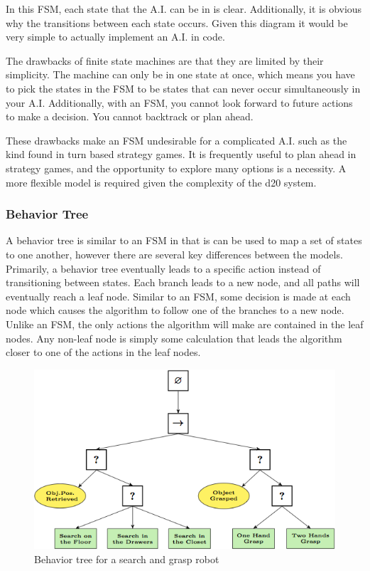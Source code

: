 \documentclass[12pt,a4paper]{report}
\begin{document}
		In this FSM, each state that the A.I. can be in is clear. Additionally, it is obvious why the transitions between each state occurs. Given this diagram it would be very simple to actually implement an A.I. in code. 
		
		The drawbacks of finite state machines are that they are limited by their simplicity. The machine can only be in one state at once, which means you have to pick the states in the FSM to be states that can never occur simultaneously in your A.I. Additionally, with an FSM, you cannot look forward to future actions to make a decision. You cannot backtrack or plan ahead. 
		
		These drawbacks make an FSM undesirable for a complicated A.I. such as the kind found in turn based strategy games. It is frequently useful to plan ahead in strategy games, and the opportunity to explore many options is a necessity. A more flexible model is required given the complexity of the d20 system. 
		
		\subsubsection{Behavior Tree}
		
		A behavior tree is similar to an FSM in that is can be used to map a set of states to one another, however there are several key differences between the models. Primarily, a behavior tree eventually leads to a specific action instead of transitioning between states. Each branch leads to a new node, and all paths will eventually reach a leaf node. Similar to an FSM, some decision is made at each node which causes the algorithm to follow one of the branches to a new node. Unlike an FSM, the only actions the algorithm will make are contained in the leaf nodes. Any non-leaf node is simply some calculation that leads the algorithm closer to one of the actions in the leaf nodes. 
		
		\begin{figure}[H]
			\centering
			\includegraphics[scale=1.5]{BTWikipedia}
			\caption{Behavior tree for a search and grasp robot \cite{bttree}}
			\label{fig: BT Robot}
		\end{figure}
		
\end{document}
